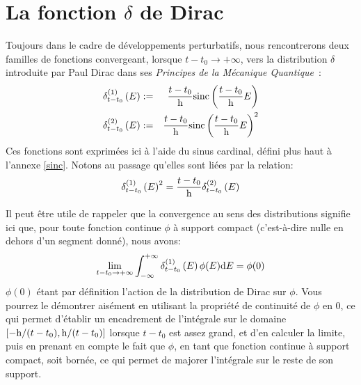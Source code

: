 \section{La fonction $\delta$ de Dirac}
\label{delta}

Toujours dans le cadre de développements perturbatifs,
nous rencontrerons deux familles de fonctions convergeant,
lorsque $t - t_0 \to +\infty$,
vers la distribution $\delta$ introduite par Paul Dirac dans ses
\textit{Principes de la Mécanique Quantique}~\cite{Dirac1930}:
\begin{eqnarray*}
\delta^{({1})}_{t - t_0} \left({E}\right) & := & \frac{t - t_0} {\mathrm h} \mathrm{sinc} \left( {\frac{t - t_0} {\mathrm h} E} \right) \\
\delta^{({2})}_{t - t_0} \left({E}\right) & := & \frac{t - t_0} {\mathrm h} \mathrm{sinc} \left( {\frac{t - t_0} {\mathrm h} E} \right)^2
\end{eqnarray*}
Ces fonctions sont exprimées ici à l'aide du sinus cardinal, défini plus haut à l'annexe \ref{sinc}.
Notons au passage qu'elles sont liées par la relation:
\begin{equation*}
\delta^{({1})}_{t - t_0} \left({E}\right)^2 = \frac{t - t_0} {\mathrm h} \delta^{({2})}_{t - t_0} \left({E}\right)
\end{equation*}

Il peut être utile de rappeler que la convergence au sens des distributions signifie ici que,
pour toute fonction continue $\phi$ à support compact (c'est-à-dire nulle en dehors d'un segment donné),
nous avons:
\begin{equation*}
\lim_{t - t_0 \to +\infty} \int_{-\infty}^{+\infty} \delta^{({1})}_{t - t_0} \left({E}\right) {\phi(E)} \mathrm dE = \phi(0)
\end{equation*}
$\phi(0)$ étant par définition l'action de la distribution de Dirac sur $\phi$.
Vous pourrez le démontrer aisément en utilisant la propriété de continuité de $\phi$ en 0,
ce qui permet d'établir un encadrement de l'intégrale sur le domaine$\left[-\mathrm h/(t - t_0), \mathrm h/(t - t_0)\right]$
lorsque $t - t_0$ est assez grand, et d'en calculer la limite,
puis en prenant en compte le fait que $\phi$, en tant que fonction continue à support compact, soit bornée,
ce qui permet de majorer l'intégrale sur le reste de son support.
